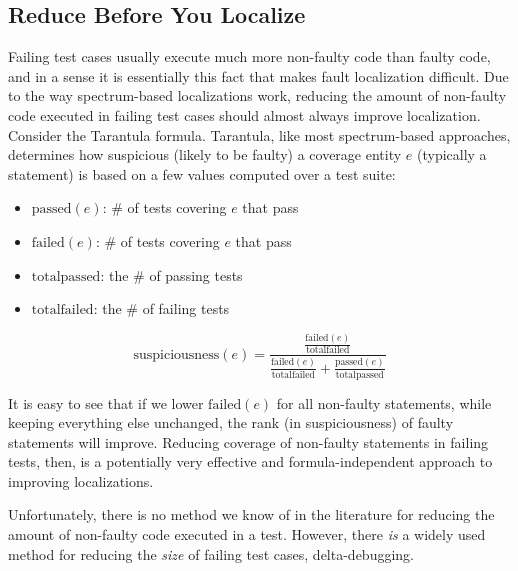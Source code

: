 \subsection{Reduce Before You Localize}
Failing test cases usually execute much more non-faulty code than
faulty code, and in a sense it is essentially this fact that makes fault localization difficult. Due to the way spectrum-based localizations work,
reducing the amount of non-faulty code executed in failing test cases
should almost always improve localization.  Consider the Tarantula
\cite{Jones2002,Tarantula} formula.  Tarantula, like most spectrum-based
approaches, determines how suspicious (likely to be faulty) a coverage
entity $e$ (typically a statement) is based on a few values computed over
a test suite:

\begin{itemize}
\item $\text{passed}(e)$:  \# of tests covering $e$ that pass
\item $\text{failed}(e)$:  \# of tests covering $e$ that pass
\item $\text{totalpassed}$:  the \# of passing tests
\item $\text{totalfailed}$:  the \# of failing tests
\end{itemize}

$$ \text{suspiciousness}(e) =  \frac{\frac{\text{failed}(e)}{\text{totalfailed}}}{\frac{\text{failed}(e)}{\text{totalfailed}} + \frac{\text{passed}(e)}{\text{totalpassed}}}$$


It is easy to see that if we lower $\text{failed}(e)$ for all
non-faulty statements, while keeping everything else unchanged, the
rank (in suspiciousness) of faulty statements will improve.   Reducing coverage of non-faulty
statements in failing tests, then, is a potentially very effective  and
formula-independent approach to improving localizations.

Unfortunately, there is no method we know of in the literature for reducing the
amount of non-faulty code executed in a test.  However, there \emph{is} a widely
used method for reducing the \emph{size} of failing test cases, delta-debugging.

